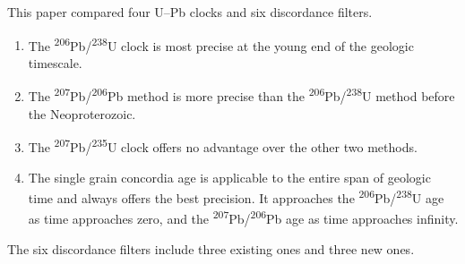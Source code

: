 \documentclass[gchron, manuscript]{copernicus}
\begin{document}
\conclusions
\label{sec:conclusions}

This paper compared four U--Pb clocks and six discordance filters.

\begin{enumerate}
  \item The \textsuperscript{206}Pb/\textsuperscript{238}U clock is
    most precise at the young end of the geologic timescale.
  \item The \textsuperscript{207}Pb/\textsuperscript{206}Pb method is
    more precise than the
    \textsuperscript{206}Pb/\textsuperscript{238}U method before the
    Neoproterozoic.
  \item The \textsuperscript{207}Pb/\textsuperscript{235}U clock
    offers no advantage over the other two methods.
  \item The single grain concordia age is applicable to the entire
    span of geologic time and always offers the best precision. It
    approaches the \textsuperscript{206}Pb/\textsuperscript{238}U age
    as time approaches zero, and the
    \textsuperscript{207}Pb/\textsuperscript{206}Pb age as time
    approaches infinity.
\end{enumerate}

\noindent The six discordance filters include three existing ones and
three new ones.
\end{document}
